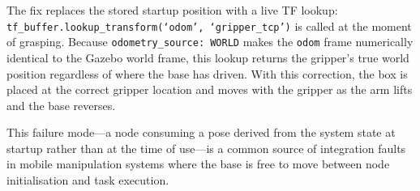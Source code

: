 The fix replaces the stored startup position with a live TF lookup:
\texttt{tf\_buffer.lookup\_transform(`odom', `gripper\_tcp')} is called at the
moment of grasping. Because \texttt{odometry\_source: WORLD} makes the
\texttt{odom} frame numerically identical to the Gazebo world frame, this lookup
returns the gripper's true world position regardless of where the base has driven.
With this correction, the box is placed at the correct gripper location and moves
with the gripper as the arm lifts and the base reverses.

This failure mode---a node consuming a pose derived from the system state at startup
rather than at the time of use---is a common source of integration faults in mobile
manipulation systems where the base is free to move between node initialisation and
task execution.
